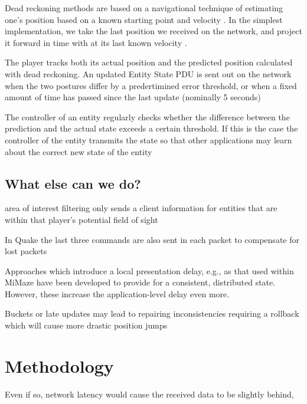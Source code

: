 \documentclass[journal]{IEEEtran}
\begin{document}
Dead reckoning methods are based on a navigational technique of estimating one’s position based on a known starting point and velocity \cite{smed2002aspects}. In the simplest implementation, we take the last position we received on the network, and project it forward in time with at its last known velocity \cite{murphy2011believable}.





The player tracks both its actual position and the predicted position calculated with dead reckoning. An updated Entity State PDU is sent out on the network when the two postures differ by a predertimined error threshold, or when a fixed amount of time has passed since the last update (nominally 5 seconds) \cite{mills1992network}

The controller of an entity regularly checks whether the difference between the prediction and the actual state exceeds a certain threshold. If this is the case the controller of the entity transmits the state so that other applications may learn about the correct new state of the entity \cite{mauve2000keep}



\subsection{What else can we do?}

area of interest filtering only sends a client information for entities that are within that player’s potential field of sight \cite{cronin2001distributed}

In Quake the last three commands are also sent in each packet to compensate for lost packets \cite{cronin2001distributed}

Approaches which introduce a local presentation delay, e.g., as that used within MiMaze \cite{gautier1998design} have been developed to provide for a consistent, distributed state. However, these increase the application-level delay even more.

Buckets or late updates may lead to repairing inconsistencies requiring a rollback which will cause more drastic position jumps \cite{cronin2002efficient}



\section{Methodology}

Even if so, network latency would cause the received data to be slightly behind, 
\end{document}
